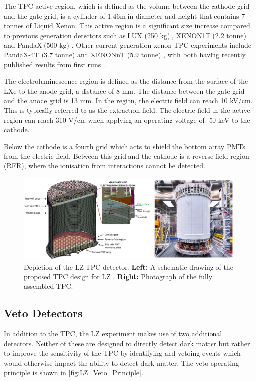 \par
The TPC active region, which is defined as the volume between the cathode grid and the gate grid, is a cylinder of 1.46m in diameter and height that contains 7 tonnes of Liquid Xenon.
This active region is a significant size increase compared to previous generation detectors such as LUX (250 kg) \cite{lux_ref}, XENON1T (2.2 tonne) \cite{xenon1t_ref} and PandaX (500 kg) \cite{pandax_ref}.
Other current generation xenon TPC experiments include PandaX-4T (3.7 tonne) \cite{pandax_4t_ref} and XENONnT (5.9 tonne) \cite{xenonnt_projected_sensitivty_ref}, with both having recently published results from first runs \cite{pandax_4t_sr1_ref,xenonnt_sr1_er_ref}. 
\par
The electroluminescence region is defined as the distance from the surface of the LXe to the anode grid, a distance of 8 mm.
The distance between the gate grid and the anode grid is 13 mm.
In the region, the electric field can reach 10 kV/cm.
This is typically referred to as the extraction field.
The electric field in the active region can reach 310 V/cm when applying an operating voltage of -50 keV to the cathode.
\par
Below the cathode is a fourth grid which acts to shield the bottom array PMTs from the electric field.
Between this grid and the cathode is a reverse-field region (RFR), where the ionisation from interactions cannot be detected.


\begin{figure}
\includegraphics[width=\columnwidth]{Figures/LZ/lz_tpc_schematic.png}%
\caption{Depiction of the LZ TPC detector.
         \textbf{Left:} A schematic drawing of the proposed TPC design for LZ \cite{LZ_TechnicalDesignReview_ref}.
         \textbf{Right:} Photograph of the fully assembled TPC.
}
\label{fig:lz_tpc_schematic}
\end{figure}


\subsection{Veto Detectors}
\label{sec:lz_veto_detectors}
\par
In addition to the TPC, the LZ experiment makes use of two additional detectors.
Neither of these are designed to directly detect dark matter but rather to improve the sensitivity of the TPC by identifying and vetoing events which would otherwise impact the ability to detect dark matter.
The veto operating principle is shown in \autoref{fig:LZ_Veto_Principle}.

